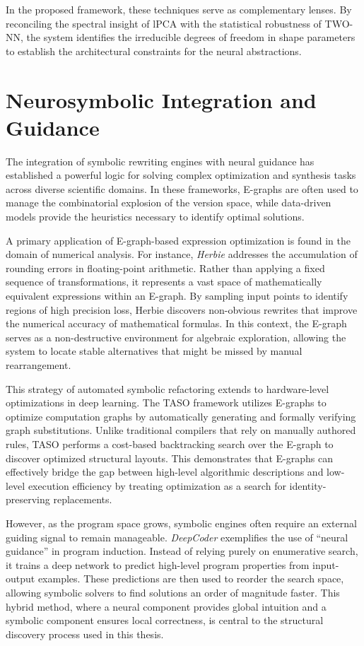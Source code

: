 \documentclass{thesis}
\begin{document}
In the proposed framework, these techniques serve as complementary lenses. By reconciling the spectral insight of lPCA with the statistical robustness of TWO-NN, the system identifies the irreducible degrees of freedom in shape parameters to establish the architectural constraints for the neural abstractions.

\section{Neurosymbolic Integration and Guidance}

The integration of symbolic rewriting engines with neural guidance has established a powerful logic for solving complex optimization and synthesis tasks across diverse scientific domains. In these frameworks, E-graphs are often used to manage the combinatorial explosion of the version space, while data-driven models provide the heuristics necessary to identify optimal solutions. 

A primary application of E-graph-based expression optimization is found in the domain of numerical analysis. For instance, \textit{Herbie} \cite{Panchekha2015} addresses the accumulation of rounding errors in floating-point arithmetic. Rather than applying a fixed sequence of transformations, it represents a vast space of mathematically equivalent expressions within an E-graph. By sampling input points to identify regions of high precision loss, Herbie discovers non-obvious rewrites that improve the numerical accuracy of mathematical formulas. In this context, the E-graph serves as a non-destructive environment for algebraic exploration, allowing the system to locate stable alternatives that might be missed by manual rearrangement.

This strategy of automated symbolic refactoring extends to hardware-level optimizations in deep learning. The TASO framework \cite{Jia2019} utilizes E-graphs to optimize computation graphs by automatically generating and formally verifying graph substitutions. Unlike traditional compilers that rely on manually authored rules, TASO performs a cost-based backtracking search over the E-graph to discover optimized structural layouts. This demonstrates that E-graphs can effectively bridge the gap between high-level algorithmic descriptions and low-level execution efficiency by treating optimization as a search for identity-preserving replacements.

However, as the program space grows, symbolic engines often require an external guiding signal to remain manageable. \textit{DeepCoder} \cite{Balog2017} exemplifies the use of ``neural guidance'' in program induction. Instead of relying purely on enumerative search, it trains a deep network to predict high-level program properties from input-output examples. These predictions are then used to reorder the search space, allowing symbolic solvers to find solutions an order of magnitude faster. This hybrid method, where a neural component provides global intuition and a symbolic component ensures local correctness, is central to the structural discovery process used in this thesis.
\end{document}
